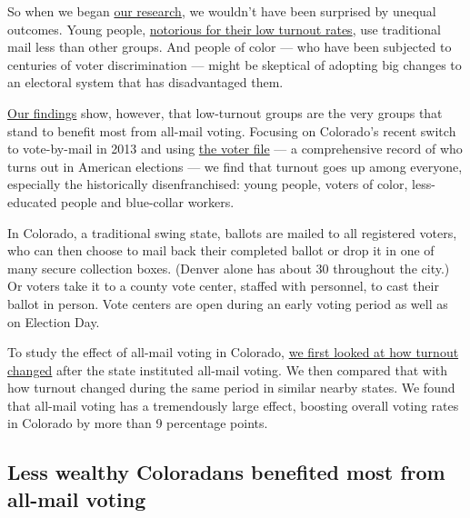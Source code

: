 So when we began
\href{https://www.dropbox.com/s/8n4zjvgmytim1rv/Bonica_Grumbach_Hill_Jefferson_Mail_Voting.pdf?raw=1}{our
research}, we wouldn't have been surprised by unequal outcomes. Young
people,
\href{https://www.nytimes.com/2020/04/12/opinion/biden-sanders-young-voters.html}{notorious
for their low turnout rates}, use traditional mail less than other
groups. And people of color --- who have been subjected to centuries of
voter discrimination --- might be skeptical of adopting big changes to
an electoral system that has disadvantaged them.

\href{https://www.dropbox.com/s/8n4zjvgmytim1rv/Bonica_Grumbach_Hill_Jefferson_Mail_Voting.pdf?raw=1}{Our
findings} show, however, that low-turnout groups are the very groups
that stand to benefit most from all-mail voting. Focusing on Colorado's
recent switch to vote-by-mail in 2013 and using
\href{https://www.pewresearch.org/fact-tank/2018/02/15/voter-files-study-qa/}{the
voter file} --- a comprehensive record of who turns out in American
elections --- we find that turnout goes up among everyone, especially
the historically disenfranchised: young people, voters of color,
less-educated people and blue-collar workers.

In Colorado, a traditional swing state, ballots are mailed to all
registered voters, who can then choose to mail back their completed
ballot or drop it in one of many secure collection boxes. (Denver alone
has about 30 throughout the city.) Or voters take it to a county vote
center, staffed with personnel, to cast their ballot in person. Vote
centers are open during an early voting period as well as on Election
Day.

To study the effect of all-mail voting in Colorado,
\href{https://www.dropbox.com/s/8n4zjvgmytim1rv/Bonica_Grumbach_Hill_Jefferson_Mail_Voting.pdf?raw=1}{we
first looked at how turnout changed} after the state instituted all-mail
voting. We then compared that with how turnout changed during the same
period in similar nearby states. We found that all-mail voting has a
tremendously large effect, boosting overall voting rates in Colorado by
more than 9 percentage points.

\hypertarget{less-wealthy-coloradans-benefited-most-from-all-mail-voting}{%
\subsection{Less wealthy Coloradans benefited most from all-mail
voting}\label{less-wealthy-coloradans-benefited-most-from-all-mail-voting}}

